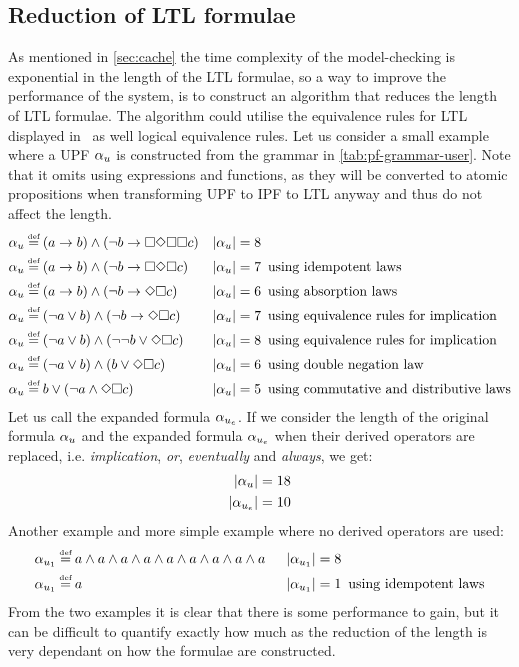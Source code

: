 \subsection{Reduction of LTL formulae}\label{sec:min-ltl}
As mentioned in \autoref{sec:cache} the time complexity of the model-checking is exponential in the length of the LTL formulae, so a way to improve the performance of the system, is to construct an algorithm that reduces the length of LTL formulae. The algorithm could utilise the equivalence rules for LTL displayed in~\cite[Fig.~5.7]{baier2008principles} as well logical equivalence rules. Let us consider a small example where a UPF $\alpha_u$ is constructed from the grammar in \autoref{tab:pf-grammar-user}. Note that it omits using expressions and functions, as they will be converted to atomic propositions when transforming UPF to IPF to LTL anyway and thus do not affect the length.
\begin{align*}
    \pf_u &\eqdef (a \imply b) \land (\lnot b \imply \G\F\G\G c)     &|\upf| = 8 & \\
    \pf_u &\eqdef (a \imply b) \land (\lnot b \imply \G\F\G c)       &|\upf| = 7 &\enskip \text{using idempotent laws} \\
    \pf_u &\eqdef (a \imply b) \land (\lnot b \imply \F\G c)         &|\upf| = 6 &\enskip \text{using absorption laws} \\
    \pf_u &\eqdef (\lnot a \lor b) \land (\lnot b \imply \F\G c)     &|\upf| = 7 &\enskip \text{using equivalence rules for implication} \\
    \pf_u &\eqdef (\lnot a \lor b) \land (\lnot \lnot b \lor \F\G c) &|\upf| = 8 &\enskip \text{using equivalence rules for implication} \\
    \pf_u &\eqdef (\lnot a \lor b) \land (b \lor \F\G c)             &|\upf| = 6 &\enskip \text{using double negation law} \\
    \pf_u &\eqdef b \lor (\lnot a \land \F\G c)                      &|\upf| = 5 &\enskip \text{using commutative and distributive laws}
\end{align*}
Let us call the expanded formula $\alpha_{u_e}$. If we consider the length of the original formula $\alpha_u$ and the expanded formula $\alpha_{u_e}$ when their derived operators are replaced, i.e. \emph{implication}, \emph{or}, \emph{eventually} and \emph{always}, we get:
\begin{align}
    |\alpha_u| = 18 \\
    |\alpha_{u_e}| = 10
\end{align}
Another example and more simple example where no derived operators are used:
\begin{align*}
    \pf_{u_1} &\eqdef a \land a \land a \land a \land a \land a \land a \land a \land a \enskip &|\pf_{u_1}| = 8 & \\
    \pf_{u_1} &\eqdef a                                                                 \enskip &|\pf_{u_1}| = 1 &\enskip \text{using idempotent laws}
\end{align*}
From the two examples it is clear that there is some performance to gain, but it can be difficult to quantify exactly how much as the reduction of the length is very dependant on how the formulae are constructed.

